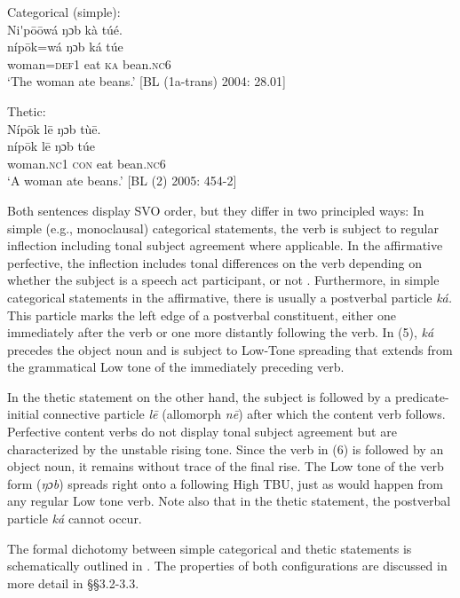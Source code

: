 \documentclass[output=paper]{langsci/langscibook}
\begin{document}
\ea
 Categorical (simple):  \\
\glll Ni\'{ }p\={o}\={o}wá  ŋɔb  kà  túé.\\
    \textup{níp\={o}k=wá  }\textup{ŋɔb  k}\textup{á}\textup{  túe}\\
     woman=\textsc{def}1  eat  \textsc{ka}  bean.\textsc{nc}6\\
\glt ‘The woman ate beans.’ [BL (1a-trans) 2004: 28.01]
\z

\ea
 Thetic:\\
\glll Níp\={o}k    l\={e}  ŋɔb  tù\={e}.\\
     \textup{níp\={o}k    l\={e}  }\textup{ŋɔb  túe}\\
     woman.\textsc{nc}1  \textsc{con}  eat  bean.\textsc{nc}6\\
\glt ‘A woman ate beans.’ [BL (2) 2005: 454-2]
\z

Both sentences display SVO order, but they differ in two principled ways: In simple (e.g., monoclausal) categorical statements, the verb is subject to regular inflection including tonal subject agreement where applicable. In the affirmative perfective, the inflection includes tonal differences on the verb depending on whether the subject is a speech act participant, or not \citep{Schwarz2007}. Furthermore, in simple categorical statements in the affirmative, there is usually a postverbal particle \textit{ká. }This particle marks the left edge of a postverbal constituent, either one immediately after the verb or one more distantly following the verb. In (5), \textit{ká }precedes the object noun and is subject to Low-Tone spreading that extends from the grammatical Low tone of the immediately preceding verb.

In the thetic statement on the other hand, the subject is followed by a predicate-initial connective particle \textit{l}\textit{\={e}}\textit{ }(allomorph \textit{n\={e}}) after which the content verb follows. Perfective content verbs do not display tonal subject agreement but are characterized by the unstable rising tone. Since the verb in (6) is followed by an object noun, it remains without trace of the final rise. The Low tone of the verb form (\textit{ŋɔb}) spreads right onto a following High TBU, just as would happen from any regular Low tone verb. Note also that in the thetic statement, the postverbal particle \textit{ká }cannot occur.

  The formal dichotomy between simple categorical and thetic statements is schematically outlined in . The properties of both configurations are discussed in more detail in §§3.2-3.3.
 
\end{document}
